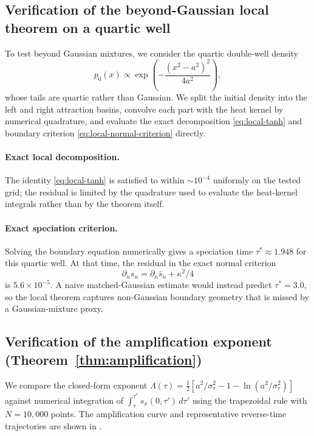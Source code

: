 \documentclass[11pt]{article}
\begin{document}
\subsection{Verification of the beyond-Gaussian local theorem on a quartic well}\label{sec:exp:quartic}

To test  beyond Gaussian mixtures, we consider the quartic double-well density
\begin{equation}\label{eq:quartic-well}
  p_0(x) \propto \exp\!\left(-\frac{(x^2-a^2)^2}{4a^2}\right),
\end{equation}
whose tails are quartic rather than Gaussian.
We split the initial density into the left and right attraction basins, convolve each part with the heat kernel by numerical quadrature, and evaluate the exact decomposition \eqref{eq:local-tanh} and boundary criterion \eqref{eq:local-normal-criterion} directly.

\paragraph{Exact local decomposition.}
The identity \eqref{eq:local-tanh} is satisfied to within ${\sim}10^{-4}$ uniformly on the tested grid; the residual is limited by the quadrature used to evaluate the heat-kernel integrals rather than by the theorem itself.

\paragraph{Exact speciation criterion.}
Solving the boundary equation numerically gives a speciation time $\tau^\ast \approx 1.948$ for this quartic well.
At that time, the residual in the exact normal criterion
\[
  \partial_n s_n = \partial_n \bar s_n + \kappa^2/4
\]
is $5.6\times 10^{-5}$.
A naive matched-Gaussian estimate would instead predict $\tau^\ast = 3.0$, so the local theorem captures non-Gaussian boundary geometry that is missed by a Gaussian-mixture proxy.


\subsection{Verification of the amplification exponent (Theorem~\ref{thm:amplification})}\label{sec:exp:amplification}

We compare the closed-form exponent $\Lambda(\tau) = \tfrac{1}{2}[a^2/\sigma_\tau^2 - 1 - \ln(a^2/\sigma_\tau^2)]$ against numerical integration of $\int_\tau^{\tau^\ast} s_x(0,\tau')\,d\tau'$ using the trapezoidal rule with $N = 10{,}000$ points.
The amplification curve and representative reverse-time trajectories are shown in .
\end{document}
